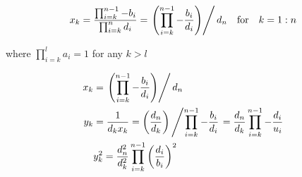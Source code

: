 \documentclass[11pt]{article}
\begin{document}
\begin{align*}
    x_k &= \frac{\prod_{i=k}^{n-1} -b_i}{\prod_{i=k}^n d_i} 
        = \left.\left(\prod_{i=k}^{n-1}-\frac{b_i}{d_i}\right) \right/ d_n \qfor k = 1:n\\
\end{align*}

where $\prod_{i=k}^{l} a_i = 1$ for any $k > l$



\begin{align*}
    x_k &= \left.\left(\prod_{i=k}^{n-1}-\frac{b_i}{d_i}\right) \right/ d_n \\
    y_k &= \frac{1}{d_k x_k}
        = \left(\frac{d_n}{d_k}\right) \left/ \prod_{i=k}^{n-1} -\frac{b_i}{d_i} \right.
        = \frac{d_n}{d_k} \prod_{i=k}^{n-1} -\frac{d_i}{u_i} \\
    &y_k^2=\frac{d_n^2}{d_k^2} \prod_{i=k}^{n-1} \left(\frac{d_i}{b_i}\right)^2
\end{align*}
\end{document}
